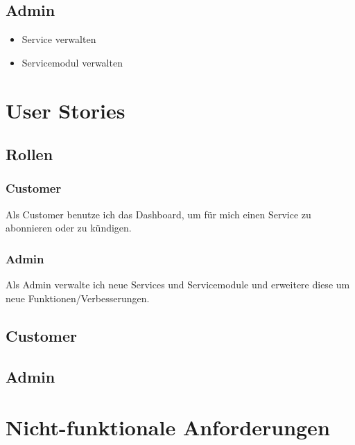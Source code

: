 \subsection{Admin}
\begin{itemize}
  \item Service verwalten
  \item Servicemodul verwalten
\end{itemize}
\section{User Stories}
\subsection{Rollen}
\subsubsection{Customer}
Als Customer benutze ich das Dashboard, um für mich einen Service zu abonnieren oder zu 
kündigen.
\subsubsection{Admin}
Als Admin verwalte ich neue Services und Servicemodule und erweitere diese um 
neue Funktionen/Verbesserungen.
\subsection{Customer}





 
  
 \subsection{Admin}
 
 
 
 

\newpage

\section{Nicht-funktionale Anforderungen}


